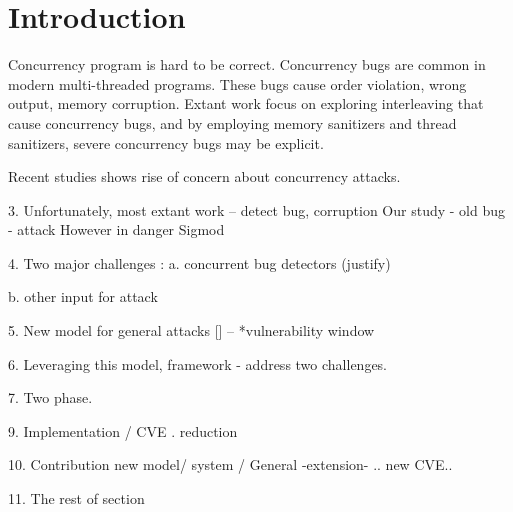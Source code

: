 \section{Introduction} \label{sec:intro}


Concurrency program is hard to be correct. 
Concurrency bugs are common in modern multi-threaded programs\cite{conmem:asplos10,conseq:asplos11}. 
These bugs cause order violation, wrong output, memory corruption.
Extant work focus on exploring interleaving that cause concurrency bugs, 
and by employing memory sanitizers and thread sanitizers, severe concurrency bugs
may be explicit.



Recent studies\cite{acidrain:sigmod17,con:hotpar12} shows rise of concern about concurrency attacks.


3. Unfortunately, most extant work -- detect bug, corruption 
   Our study - old bug - attack
   However in danger
   Sigmod 

4. Two major challenges : 
a. concurrent bug detectors (justify) 

b. other input for attack


5. New model for general attacks [] -- *vulnerability window 


6. Leveraging this model, framework - address two challenges.

7. Two phase. 

9. Implementation / CVE . reduction

10. Contribution
     new model/ system / General -extension- .. new CVE..

11. The rest of section





